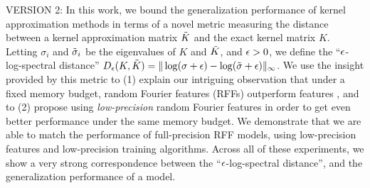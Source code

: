 VERSION 2: In this work, we bound the generalization performance of kernel approximation methods in terms of a novel metric measuring the distance between a kernel approximation matrix $\tilde{K}$ and the exact kernel matrix $K$.  Letting $\sigma_i$ and $\tilde{\sigma}_i$ be the eigenvalues of $K$ and $\tilde{K}$, and $\epsilon > 0$, we define the ``$\epsilon$-log-spectral distance'' $D_{\epsilon}(K,\tilde{K}) =  \|\log(\sigma + \epsilon)-\log(\tilde{\sigma}+\epsilon)\|_{\infty}$. 
We use the insight provided by this metric to (1) explain our intriguing observation that under a fixed memory budget, random Fourier features (RFFs) \citep{rahimi07random} outperform \Nystrom features \citep{nystrom}, and to (2) propose using \emph{low-precision} random Fourier features in order to get even better performance under the same memory budget. We demonstrate that we are able to match the performance of full-precision RFF models, using low-precision features and low-precision training algorithms.  Across all of these experiments, we show a very strong correspondence between the ``$\epsilon$-log-spectral distance'', and the generalization performance of a model.










